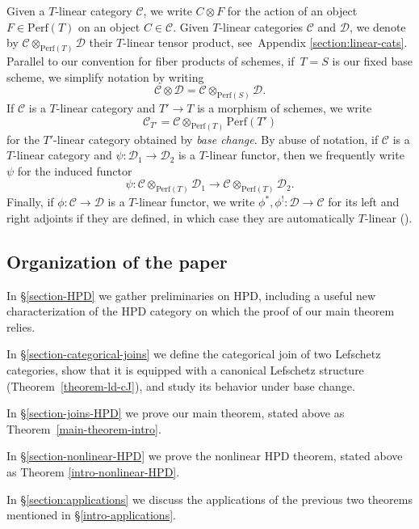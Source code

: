 \documentclass[11pt, reqno]{amsart}
\numberwithin{equation}{section}
\theoremstyle{plain}
\theoremstyle{definition}
\newcommand{\Perf}{\mathrm{Perf}}
\newcommand{\cC}{\mathcal{C}}
\newcommand{\cD}{\mathcal{D}}
\begin{document}
Given a $T$-linear category $\cC$, we write $C \otimes F$ 
for the action of an object $F \in \Perf(T)$ on an object $C \in \cC$. 
Given $T$-linear categories $\cC$ and $\cD$, we denote by $\cC \otimes_{\Perf(T)} \cD$ their 
$T$-linear tensor product, see~Appendix \ref{section:linear-cats}.
Parallel to our convention for fiber products of schemes, if~\mbox{$T = S$} is our fixed base scheme, 
we simplify notation by writing 
\begin{equation*}
\cC \otimes \cD = \cC \otimes_{\Perf(S)} \cD. 
\end{equation*}
If $\cC$ is a $T$-linear category and $T' \to T$ is a morphism of schemes, we write 
\begin{equation*}
\cC_{T'} = \cC \otimes_{\Perf(T)} \Perf(T')
\end{equation*}
for the $T'$-linear category obtained by \emph{base change}. 
By abuse of notation, if $\cC$ is a $T$-linear category and $\psi \colon \cD_1 \to \cD_2$ 
is a $T$-linear functor, 
then we frequently write $\psi$ for the induced functor 
\begin{equation*}
\psi \colon \cC \otimes_{\Perf(T)} \cD_1 \to \cC \otimes_{\Perf(T)} \cD_2. 
\end{equation*} 
Finally, if $\phi \colon \cC \to \cD$ is a $T$-linear functor, we write $\phi^*, \phi^! \colon \cD \to \cC$ 
for its left and right adjoints if they are defined, in which case they are automatically $T$-linear (\cite[Lemma 2.11]{NCHPD}).

\subsection{Organization of the paper} 
In \S\ref{section-HPD} we gather preliminaries on HPD, including 
a useful new characterization of the HPD category on which the proof of our main theorem relies.

In \S\ref{section-categorical-joins} we define the categorical join 
of two Lefschetz categories, show that it is equipped with a canonical 
Lefschetz structure (Theorem~\ref{theorem-ld-cJ}), and study its behavior under base change. 

In \S\ref{section-joins-HPD} we prove our main theorem, stated above 
as Theorem~\ref{main-theorem-intro}. 

In \S\ref{section-nonlinear-HPD} we prove the nonlinear HPD theorem, 
stated above as Theorem \ref{intro-nonlinear-HPD}. 

In \S\ref{section:applications} we discuss the applications  
of the previous two theorems mentioned in \S\ref{intro-applications}. 
\end{document}
